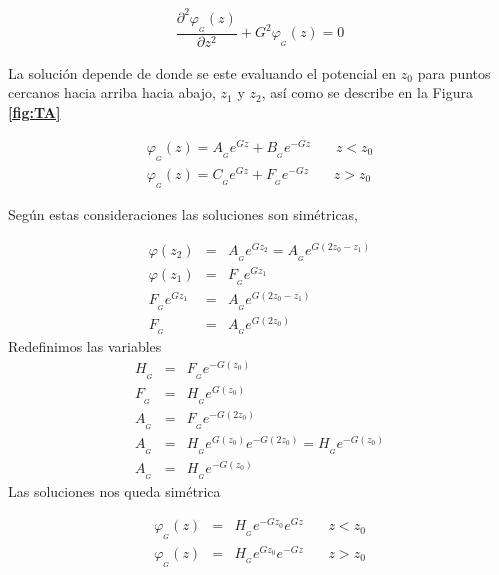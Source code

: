 \documentclass[a4paper,11pt,]{book}
\begin{document}
\begin{eqnarray}
\dfrac{\partial^2 \varphi_{_{G}}(z)}{\partial z^2}+ G^2\varphi_{_{G}}(z)=0
\end{eqnarray}

La solución depende de donde se este evaluando el potencial en $z_0$ para puntos cercanos hacia arriba hacia abajo, $z_1$ y $z_2$, así como se describe en la Figura \textbf{\ref{fig:TA} }

\begin{eqnarray}
\varphi_{_{G}}(z)=A_{_G}  e^{G z} + B_{_G}  e^{-G z} \ \ \ \ \ \ \ \ z<z_0 \\
\varphi_{_{G}}(z)=C_{_G}  e^{G z} + F_{_G}  e^{-G z} \ \ \ \ \ \ \ \ z>z_0
\end{eqnarray}



Según estas consideraciones las soluciones son simétricas, 

\begin{eqnarray*}
	\varphi(z_2)&=& A_{_G}  e^{G z_2} = A_{_G}  e^{G (2z_0-z_1)}\\
	\varphi(z_1)&=& F_{_G}  e^{G z_1} \\
	F_{_G}  e^{G z_1}&=& A_{_G}  e^{G (2z_0-z_1)}\\
	F_{_G} & =& A_{_G}  e^{G (2z_0)}
\end{eqnarray*}
Redefinimos las variables 
\begin{eqnarray*}
	H_{_G} & =& F_{_G}  e^{-G (z_0)}\\
	F_{_G} & =& H_{_G}  e^{G (z_0)}\\
	A_{_G} & =& F_{_G}  e^{-G (2z_0)}\\
	A_{_G} &=& H_{_G} e^{G (z_0)} e^{-G (2z_0)}=H_{_G} e^{-G (z_0)}\\
	A_{_G} &=& H_{_G} e^{-G (z_0)}   
\end{eqnarray*}
Las soluciones nos queda simétrica

\begin{eqnarray*}
	\varphi_{_{G}}(z)&=& H_{_G}  e^{-G z_0} e^{G z} \ \ \ \ \ \ \ \ z<z_0 \\
	\varphi_{_{G}}(z)&=& H_{_G} e^{G z_0} e^{-G z} \ \ \ \ \ \ \ \ z>z_0
\end{eqnarray*}
\end{document}
